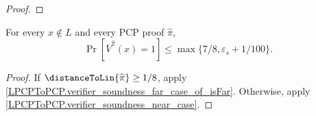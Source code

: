 \begin{proof}

\end{proof}


\begin{lemma}[Soundness]
\label{LPCPToPCP.verifier_soundness_of_cases}
\leanok
For every \(x\notin L\) and every PCP proof \(\widehat{\pi}\),
\[
  \Pr[\overline V^{\widehat{\pi}}(x)=1]
  \leq \max\{7/8,\varepsilon_s+1/100\}.
\]
\end{lemma}
\begin{proof}\leanok
If \(\distanceToLin{\widehat{\pi}} \geq 1 / 8\), apply \ref{LPCPToPCP.verifier_soundness_far_case_of_isFar}. Otherwise, apply
\ref{LPCPToPCP.verifier_soundness_near_case}.
\end{proof}

